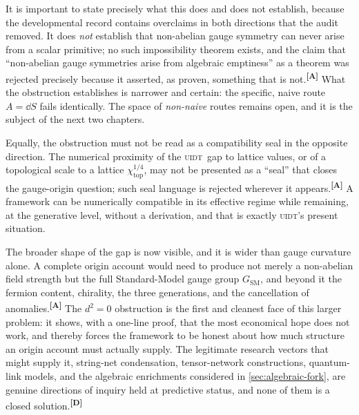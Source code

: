 \documentclass[12pt,a4paper,twoside]{article}
\theoremstyle{plain}
\theoremstyle{definition}
\theoremstyle{remark}
\newcommand{\UIDT}{\textsc{uidt}}
\newcommand{\catmark}[1]{\textsuperscript{\textsf{\textbf{[#1]}}}}
\begin{document}
It is important to state precisely what this does and does not establish, because the developmental record contains overclaims in both directions that the audit removed. It does \emph{not} establish that non-abelian gauge symmetry can never arise from a scalar primitive; no such impossibility theorem exists, and the claim that ``non-abelian gauge symmetries arise from algebraic emptiness'' as a theorem was rejected precisely because it asserted, as proven, something that is not.\catmark{A} What the obstruction establishes is narrower and certain: the specific, naive route $A = \dd S$ fails identically. The space of \emph{non-naive} routes remains open, and it is the subject of the next two chapters.

Equally, the obstruction must not be read as a compatibility seal in the opposite direction. The numerical proximity of the \UIDT\ gap to lattice values, or of a topological scale to a lattice $\chi_{\mathrm{top}}^{1/4}$, may not be presented as a ``seal'' that closes the gauge-origin question; such seal language is rejected wherever it appears.\catmark{A} A framework can be numerically compatible in its effective regime while remaining, at the generative level, without a derivation, and that is exactly \UIDT's present situation.

The broader shape of the gap is now visible, and it is wider than gauge curvature alone. A complete origin account would need to produce not merely a non-abelian field strength but the full Standard-Model gauge group $G_{\mathrm{SM}}$, and beyond it the fermion content, chirality, the three generations, and the cancellation of anomalies.\catmark{A} The $d^2 = 0$ obstruction is the first and cleanest face of this larger problem: it shows, with a one-line proof, that the most economical hope does not work, and thereby forces the framework to be honest about how much structure an origin account must actually supply. The legitimate research vectors that might supply it, string-net condensation, tensor-network constructions, quantum-link models, and the algebraic enrichments considered in \cref{sec:algebraic-fork}, are genuine directions of inquiry held at predictive status, and none of them is a closed solution.\catmark{D}
\end{document}
